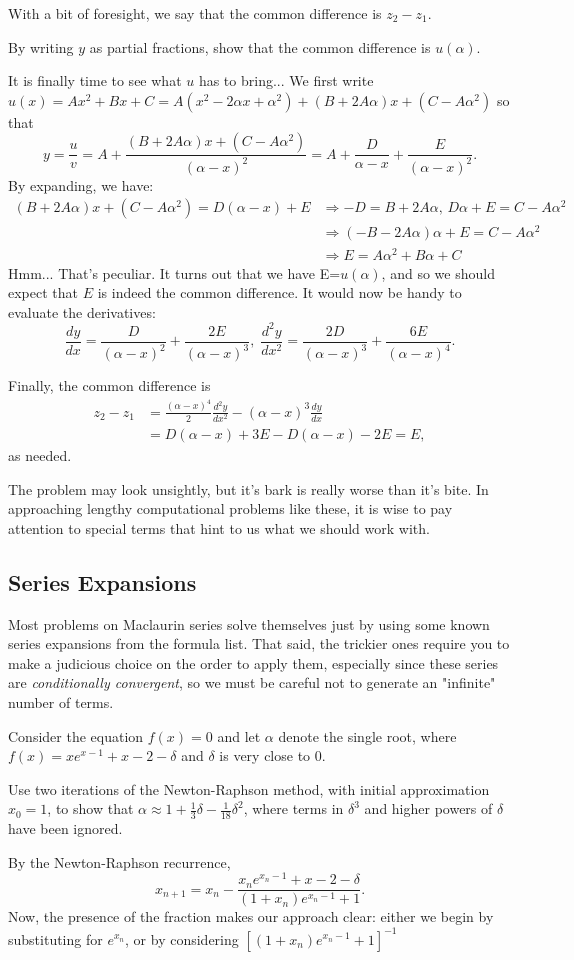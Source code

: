\documentclass[../main.tex]{subfiles}
\begin{document}
With a bit of foresight, we say that the common difference is $z_2-z_1.$
\begin{example}[cont.]
By writing $y$ as partial fractions, show that the common difference is $u(\alpha)$.
\end{example}
It is finally time to see what $u$ has to bring... We first write $u(x)=Ax^2+Bx+C = A(x^2-2\alpha x+\alpha^2)+(B+2A\alpha)x+(C-A\alpha^2)$ so that
$$y=\frac{u}{v}=A+\frac{(B+2A\alpha)x+(C-A\alpha^2)}{(\alpha-x)^2}=A+\frac{D}{\alpha-x}+\frac{E}{(\alpha-x)^2}.$$
By expanding, we have:
\begin{align*}
    (B+2A\alpha)x+(C-A\alpha^2)=D(\alpha-x)+E &\Longrightarrow -D=B+2A\alpha, \, D\alpha+E=C-A\alpha^2 \\
    &\Longrightarrow (-B-2A\alpha)\alpha+E=C-A\alpha^2 \\
    &\Longrightarrow E=A\alpha^2+B\alpha+C
\end{align*}
Hmm... That's peculiar. It turns out that we have E=$u(\alpha)$, and so we should expect that $E$ is indeed the common difference.
It would now be handy to evaluate the derivatives: $$\frac{dy}{dx}=\frac{D}{(\alpha-x)^2}+\frac{2E}{(\alpha-x)^3},\; \frac{d^2y}{dx^2}=\frac{2D}{(\alpha-x)^3}+\frac{6E}{(\alpha-x)^4}.$$

Finally, the common difference is
\begin{align*}
    z_2-z_1&=\frac{(\alpha-x)^4}{2}\frac{d^2y}{dx^2}-(\alpha-x)^3\frac{dy}{dx} \\
    &=D(\alpha-x)+3E-D(\alpha-x)-2E=E,
\end{align*}
as needed.
\begin{moral}
The problem may look unsightly, but it's bark is really worse than it's bite. In approaching lengthy computational problems like these, it is wise to pay attention to special terms that hint to us what we should work with.
\end{moral}
\subsection{Series Expansions}
Most problems on Maclaurin series solve themselves just by using some known series expansions from the formula list. That said, the trickier ones require you to make a judicious choice on the order to apply them, especially since these series are \textit{conditionally convergent}, so we must be careful not to generate an "infinite" number of terms.
\begin{example} 
Consider the equation $f(x)=0$ and let $\alpha$ denote the single root, where $f(x)=xe^{x-1}+x-2-\delta$ and $\delta$ is very close to $0$.

Use two iterations of the Newton-Raphson method, with initial approximation $x_0=1$, to show that $\alpha \approx 1+\frac{1}{3}\delta-\frac{1}{18}\delta^2$, where terms in $\delta^3$ and higher powers of $\delta$ have been ignored.
\end{example}
By the Newton-Raphson recurrence, $$x_{n+1}=x_n-\frac{x_ne^{x_n-1}+x-2-\delta}{(1+x_n)e^{x_n-1}+1}.$$
Now, the presence of the fraction makes our approach clear: either we begin by substituting for $e^{x_n}$, or by considering $\left[(1+x_n)e^{x_n-1}+1\right]^{-1}$
\end{document}
